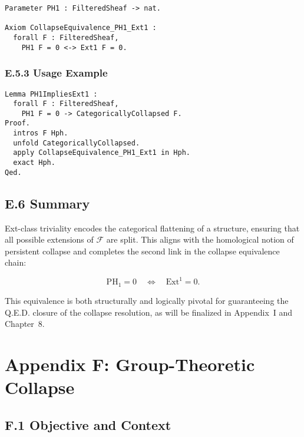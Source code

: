 \documentclass[11pt]{article}
\DeclareMathOperator{\PH}{PH}
\begin{document}
\begin{lstlisting}[language=Coq, caption=\(\PH_1\) \( \iff \) Ext¹ Equivalence Axiom, captionpos=b]
Parameter PH1 : FilteredSheaf -> nat.

Axiom CollapseEquivalence_PH1_Ext1 :
  forall F : FilteredSheaf,
    PH1 F = 0 <-> Ext1 F = 0.
\end{lstlisting}

\subsubsection*{E.5.3 Usage Example}

\begin{lstlisting}[language=Coq, caption=Collapse Equivalence Inference, captionpos=b]
Lemma PH1ImpliesExt1 :
  forall F : FilteredSheaf,
    PH1 F = 0 -> CategoricallyCollapsed F.
Proof.
  intros F Hph.
  unfold CategoricallyCollapsed.
  apply CollapseEquivalence_PH1_Ext1 in Hph.
  exact Hph.
Qed.
\end{lstlisting}

\subsection*{E.6 Summary}

Ext-class triviality encodes the categorical flattening of a structure, ensuring that all possible extensions of \( \mathcal{F} \) are split. This aligns with the homological notion of persistent collapse and completes the second link in the collapse equivalence chain:

\[
\mathrm{PH}_1 = 0 \quad \iff \quad \mathrm{Ext}^1 = 0.
\]

This equivalence is both structurally and logically pivotal for guaranteeing the Q.E.D. closure of the collapse resolution, as will be finalized in Appendix~I and Chapter~8.



\appendix
\section*{Appendix F: Group-Theoretic Collapse}

\subsection*{F.1 Objective and Context}
\end{document}
